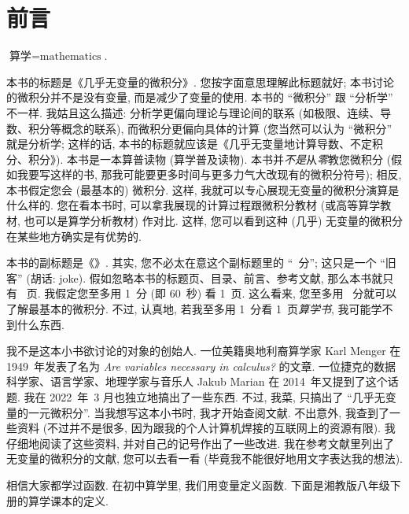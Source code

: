 \chapter*{前言}

\begin{definition*}
    $\text{算学} = \text{mathematics}$.
\end{definition*}

本书的标题是《几乎无变量的微积分》. 您按字面意思理解此标题就好; 本书讨论的微积分并不是没有变量, 而是减少了变量的使用. 本书的 ``微积分'' 跟 ``分析学'' 不一样. 我姑且这么描述: 分析学更偏向理论与理论间的联系 (如极限、连续、导数、积分等概念的联系), 而微积分更偏向具体的计算 (您当然可以认为 ``微积分'' 就是分析学; 这样的话, 本书的标题就应该是《几乎无变量地计算导数、不定积分、积分》). 本书是一本算普读物 (算学普及读物). 本书并\emph{不是}从\emph{零}教您微积分 (假如我要写这样的书, 那我可能要更多时间与更多力气大改现有的微积分符号); 相反, 本书假定您会 (最基本的) 微积分. 这样, 我就可以专心展现无变量的微积分演算是什么样的. 您在看本书时, 可以拿我展现的计算过程跟微积分教材 (或高等算学教材, 也可以是算学分析教材) 作对比. 这样, 您可以看到这种 (几乎) 无变量的微积分在某些地方确实是有优势的.

本书的副标题是《\CalculusSubtitle 》. 其实, 您不必太在意这个副标题里的 ``\pageref{calculus:LastPage}~分''; 这只是一个 ``旧客'' (胡话: joke). 假如忽略本书的标题页、目录、前言、参考文献, 那么本书就只有 \pageref{calculus:LastPage}~页. 我假定您至多用 1~分 (即 60~秒) 看 1~页. 这么看来, 您至多用 \pageref{calculus:LastPage}~分就可以了解最基本的微积分. 不过, 认真地, 若我至多用 1~分看 1~页\emph{算学书}, 我可能学不到什么东西.

我不是这本小书欲讨论的对象的创始人. 一位美籍奥地利裔算学家 Karl Menger 在 1949~年发表了名为 \textit{Are variables necessary in calculus?} 的文章. 一位捷克的数据科学家、语言学家、地理学家与音乐人 Jakub Marian 在 2014~年又提到了这个话题. 我在 2022~年~3 月也独立地搞出了一些东西. 不过, 我菜, 只搞出了 ``几乎无变量的一元微积分''. 当我想写这本小书时, 我才开始查阅文献. 不出意外, 我查到了一些资料 (不过并不是很多, 因为跟我的个人计算机焊接的互联网上的资源有限). 我仔细地阅读了这些资料, 并对自己的记号作出了一些改进. 我在参考文献里列出了无变量的微积分的文献, 您可以去看一看 (毕竟我不能很好地用文字表达我的想法).

相信大家都学过函数. 在初中算学里, 我们用变量定义函数. 下面是湘教版八年级下册的算学课本的定义.

